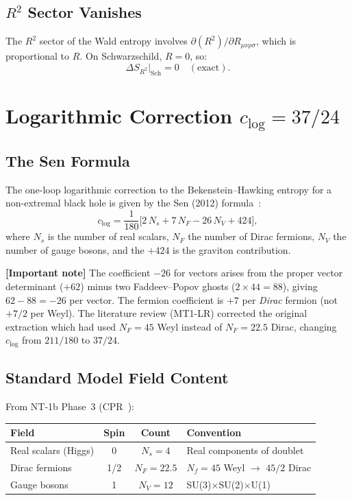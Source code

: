 \documentclass[11pt,a4paper]{article}
\theoremstyle{plain}
\theoremstyle{definition}
\newcommand{\signcorrection}[1]{%
  \par\smallskip\noindent
  \colorbox{red!10}{\parbox{\dimexpr\linewidth-2\fboxsep}{%
    \textcolor{red!60!black}{\textbf{[Important note]}} #1}}%
  \par\smallskip}
\begin{document}
\subsection{$R^2$ Sector Vanishes}

The $R^2$ sector of the Wald entropy involves
$\partial(R^2)/\partial R_{\mu\nu\rho\sigma}$, which is
proportional to $R$. On Schwarzschild, $R = 0$, so:
\begin{equation}\label{eq:S-R2-zero}
  \Delta S_{R^2}\big|_{\mathrm{Sch}} = 0 \quad (\text{exact}).
\end{equation}

\section{Logarithmic Correction $c_{\log} = 37/24$}
\label{sec:c-log}

\subsection{The Sen Formula}

The one-loop logarithmic correction to the Bekenstein--Hawking entropy
for a non-extremal black hole is given by the Sen (2012)
formula~\cite{Sen12}:
\begin{equation}\label{eq:sen-formula}
  c_{\log} = \frac{1}{180}\bigl[
  2\,N_s + 7\,N_F - 26\,N_V + 424\bigr],
\end{equation}
where $N_s$ is the number of real scalars, $N_F$ the number of
Dirac fermions, $N_V$ the number of gauge bosons, and the $+424$
is the graviton contribution.

\signcorrection{The coefficient $-26$ for vectors arises from the
proper vector determinant ($+62$) minus two Faddeev--Popov ghosts
($2 \times 44 = 88$), giving $62 - 88 = -26$ per vector.
The fermion coefficient is $+7$ per \emph{Dirac} fermion
(not $+7/2$ per Weyl). The literature review (MT1-LR) corrected
the original extraction which had used $N_F = 45$ Weyl instead
of $N_F = 22.5$ Dirac, changing $c_{\log}$ from $211/180$ to $37/24$.}

\subsection{Standard Model Field Content}

From NT-1b Phase~3 (CPR~\cite{CPR09}):
\begin{center}
\begin{tabular}{lccl}
\toprule
Field & Spin & Count & Convention \\
\midrule
Real scalars (Higgs) & 0 & $N_s = 4$ & Real components of doublet \\
Dirac fermions & 1/2 & $N_F = 22.5$ & $N_f = 45$ Weyl $\to$ $45/2$ Dirac \\
Gauge bosons & 1 & $N_V = 12$ & SU(3)$\times$SU(2)$\times$U(1) \\
\bottomrule
\end{tabular}
\end{center}
\end{document}
